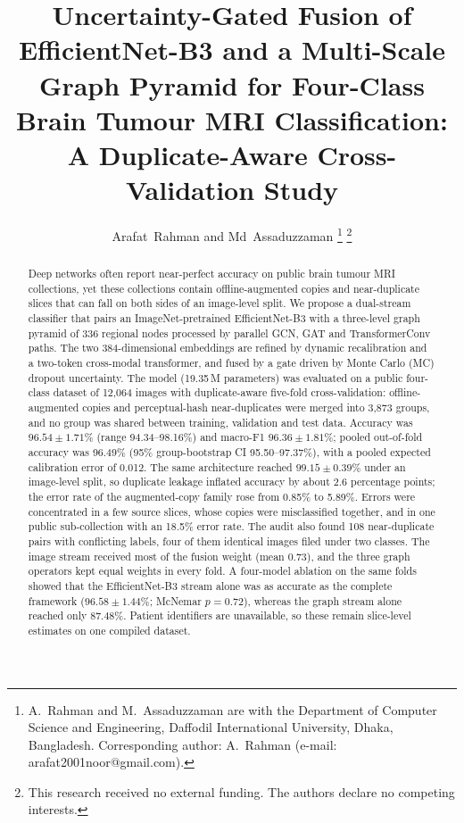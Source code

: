 \documentclass[journal,onecolumn]{IEEEtran}
\begin{document}
\title{Uncertainty-Gated Fusion of EfficientNet-B3 and a Multi-Scale Graph Pyramid for Four-Class Brain Tumour MRI Classification: A Duplicate-Aware Cross-Validation Study}

\author{Arafat~Rahman and Md~Assaduzzaman%
\thanks{A.~Rahman and M.~Assaduzzaman are with the Department of Computer Science and Engineering, Daffodil International University, Dhaka, Bangladesh. Corresponding author: A.~Rahman (e-mail: arafat2001noor@gmail.com).}%
\thanks{This research received no external funding. The authors declare no competing interests.}}


\maketitle

\begin{abstract}
Deep networks often report near-perfect accuracy on public brain tumour MRI collections, yet these collections contain offline-augmented copies and near-duplicate slices that can fall on both sides of an image-level split. We propose a dual-stream classifier that pairs an ImageNet-pretrained EfficientNet-B3 with a three-level graph pyramid of 336 regional nodes processed by parallel GCN, GAT and TransformerConv paths. The two 384-dimensional embeddings are refined by dynamic recalibration and a two-token cross-modal transformer, and fused by a gate driven by Monte Carlo (MC) dropout uncertainty. The model (19.35\,M parameters) was evaluated on a public four-class dataset of 12,064 images with duplicate-aware five-fold cross-validation: offline-augmented copies and perceptual-hash near-duplicates were merged into 3,873 groups, and no group was shared between training, validation and test data. Accuracy was $96.54 \pm 1.71\%$ (range 94.34--98.16\%) and macro-F1 $96.36 \pm 1.81\%$; pooled out-of-fold accuracy was 96.49\% (95\% group-bootstrap CI 95.50--97.37\%), with a pooled expected calibration error of 0.012. The same architecture reached $99.15 \pm 0.39\%$ under an image-level split, so duplicate leakage inflated accuracy by about 2.6 percentage points; the error rate of the augmented-copy family rose from 0.85\% to 5.89\%. Errors were concentrated in a few source slices, whose copies were misclassified together, and in one public sub-collection with an 18.5\% error rate. The audit also found 108 near-duplicate pairs with conflicting labels, four of them identical images filed under two classes. The image stream received most of the fusion weight (mean 0.73), and the three graph operators kept equal weights in every fold. A four-model ablation on the same folds showed that the EfficientNet-B3 stream alone was as accurate as the complete framework ($96.58 \pm 1.44\%$; McNemar $p = 0.72$), whereas the graph stream alone reached only $87.48\%$. Patient identifiers are unavailable, so these remain slice-level estimates on one compiled dataset.
\end{abstract}
\end{document}

